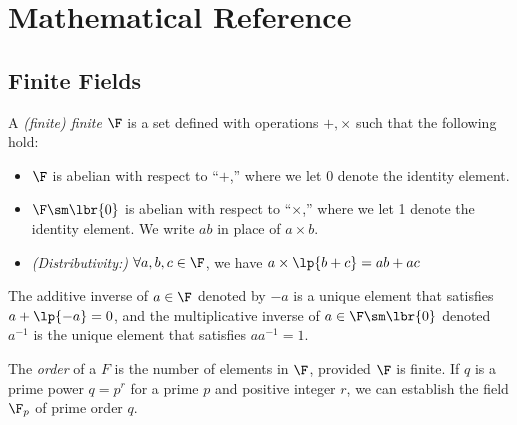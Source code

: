 

\appendix

\section{Mathematical Reference} %
\label{sec:mathematical_reference}


\subsection{Finite Fields} %
\label{sub:finite_fields}


\begin{definition}
A \emph{(finite) finite} $\F$ is a set defined with operations $+, \times$ such that the following hold:
\begin{itemize}
	\item $\F$ is abelian with respect to ``$+$,'' where we let 0 denote the identity element.
	\item $\F \sm \lbr{0}$ is abelian with respect to ``$\times$,'' where we let 1 denote the identity element. We write $ab$ in place of $a \times b$.
	\item \emph{(Distributivity:) }$\forall a, b, c \in \F$, we have $a \times \lp{b + c} = ab + ac$
\end{itemize}
\end{definition}
The additive inverse of $a \in \F$ denoted by $-a$ is a unique element that satisfies $a + \lp{-a} = 0$, and the multiplicative inverse of $a \in \F \sm \lbr{0}$ denoted $a^{-1}$ is the unique element that satisfies $a a^{-1} = 1$.

The \emph{order} of a $F$ is the number of elements in $\F$, provided $\F$ is finite. If $q$ is a prime power $q = p^r$ for a prime $p$ and positive integer $r$, we can establish the field $\F_p$ of prime order $q$.

